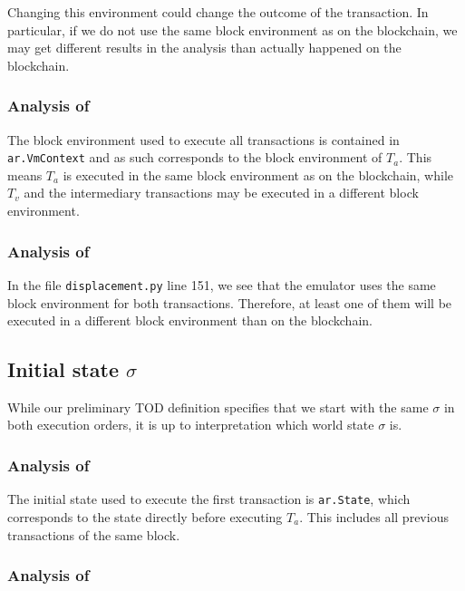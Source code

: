 \documentclass[draft,final]{vutinfth} %
\begin{document}
Changing this environment could change the outcome of the transaction. In particular, if we do not use the same block environment as on the blockchain, we may get different results in the analysis than actually happened on the blockchain.

\subsubsection{Analysis of \cite{zhang_combatting_2023}}

The block environment used to execute all transactions is contained in \verb|ar.VmContext| and as such corresponds to the block environment of $T_a$. This means $T_a$ is executed in the same block environment as on the blockchain, while $T_v$ and the intermediary transactions may be executed in a different block environment.

\subsubsection{Analysis of \cite{torres_frontrunner_2021}}

In the file \verb|displacement.py| line 151, we see that the emulator uses the same block environment for both transactions. Therefore, at least one of them will be executed in a different block environment than on the blockchain.

\subsection{Initial state $\sigma$}

While our preliminary TOD definition specifies that we start with the same $\sigma$ in both execution orders, it is up to interpretation which world state $\sigma$ is.

\subsubsection{Analysis of \cite{zhang_combatting_2023}}

The initial state used to execute the first transaction is \verb|ar.State|, which corresponds to the state directly before executing $T_a$. This includes all previous transactions of the same block.

\subsubsection{Analysis of \cite{torres_frontrunner_2021}}
\end{document}
